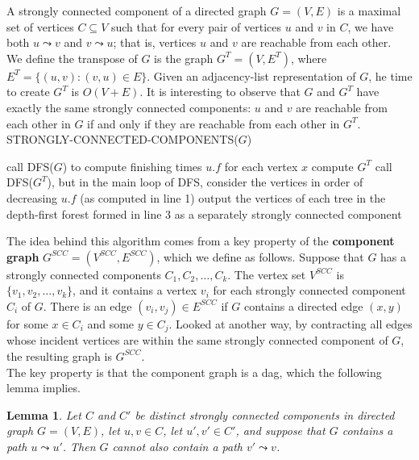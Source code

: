 \documentclass[12pt]{article}
\newtheorem{lemma}[theorem]{Lemma}
\begin{document}
A strongly connected component of a directed graph $G=(V,E)$ is a maximal set of vertices $C \subseteq V$ such that for every pair of vertices $u$ and $v$ in $C$, we have both $u \leadsto v$ and $v \leadsto u$; that is, vertices $u$ and $v$ are reachable from each other. \\

We define the transpose of $G$ is the graph $G^T = (V,E^T)$, where $E^T = \{(u,v) : (v,u) \in E \}$. Given an adjacency-list representation of $G$, he time to create $G^T$ is $O(V+E)$. It is interesting to observe that $G$ and $G^T$ have exactly the same strongly connected components: $u$ and $v$ are reachable from each other in $G$ if and only if they are reachable from each other in $G^T$. \\

STRONGLY-CONNECTED-COMPONENTS($G$)
\begin{algorithmic} [1]
\State call DFS($G$) to compute finishing times $u.f$ for each vertex $x$
\State compute $G^T$
\State call DFS($G^T$), but in the main loop of DFS, consider the vertices in order of decreasing $u.f$ (as computed in line 1)
\State output the vertices of each tree in the depth-first forest formed in line 3 as a separately strongly connected component
\end{algorithmic}

The idea behind this algorithm comes from a key property of the \textbf{component graph} $G^{SCC} = (V^{SCC}, E^{SCC})$, which we define as follows. Suppose that $G$ has a strongly connected components $C_1, C_2, \dots, C_k$. The vertex set $V^{SCC}$ is $\{ v_1, v_2, \dots, v_k \}$, and it contains a vertex $v_i$ for each strongly connected component $C_i$ of $G$. There is an edge $(v_i, v_j) \in E^{SCC}$ if $G$ contains a directed edge $(x, y)$ for some $x \in C_i$ and some $y \in C_j$. Looked at another way, by contracting all edges whose incident vertices are within the same strongly connected component of $G$, the resulting graph is $G^{SCC}$. \\

The key property is that the component graph is a dag, which the following lemma implies.

\begin{lemma}
  Let $C$ and $C'$ be distinct strongly connected components in directed graph $G = (V,E)$, let $u,v \in C$, let $u', v' \in C'$, and suppose that $G$ contains a path $u \leadsto u'$. Then $G$ cannot also contain a path $v' \leadsto v$.
\end{lemma}
\end{document}

